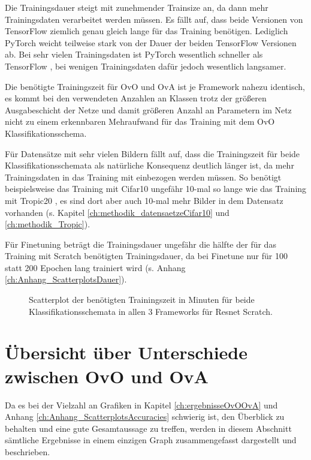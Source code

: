 Die Trainingsdauer steigt mit zunehmender Trainsize an, da dann mehr Trainingsdaten verarbeitet werden müssen.
Es fällt auf, dass beide Versionen von TensorFlow \cite{tensorflow} ziemlich genau gleich lange für das Training benötigen. Lediglich PyTorch \cite{pytorch} weicht teilweise stark von der Dauer der beiden TensorFlow \cite{tensorflow} Versionen ab. Bei sehr vielen Trainingsdaten ist PyTorch \cite{pytorch} wesentlich schneller als TensorFlow \cite{tensorflow}, bei wenigen Trainingsdaten dafür jedoch wesentlich langsamer.

Die benötigte Trainingszeit für OvO und OvA ist je Framework nahezu identisch, es kommt bei den verwendeten Anzahlen an Klassen trotz der größeren Ausgabeschicht der Netze und damit größeren Anzahl an Parametern im Netz nicht zu einem erkennbaren Mehraufwand für das Training mit dem OvO Klassifikationsschema.

Für Datensätze mit sehr vielen Bildern fällt auf, dass die Trainingszeit für beide Klassifikationsschemata als natürliche Konsequenz deutlich länger ist, da mehr Trainingsdaten in das Training mit einbezogen werden müssen. So benötigt beispielsweise das Training mit Cifar10 \cite{cifar10} ungefähr 10-mal so lange wie das Training mit Tropic20 \cite{pawaraWebsiteDatensaetze}, es sind dort aber auch 10-mal mehr Bilder in dem Datensatz vorhanden (s. Kapitel \ref{ch:methodik_datensaetzeCifar10} und \ref{ch:methodik_Tropic}).

Für Finetuning beträgt die Trainingsdauer ungefähr die hälfte der für das Training mit Scratch benötigten Trainingsdauer, da bei Finetune nur für 100 statt 200 Epochen lang trainiert wird (s. Anhang \ref{ch:Anhang_ScatterplotsDauer}).


\begin{figure}[H]
\begin{adjustbox}{width=\textwidth, center}

\end{adjustbox}
\caption{Scatterplot der benötigten Trainingszeit in Minuten für beide Klassifikationsschemata in allen 3 Frameworks für Resnet Scratch.}
\label{fig:ScatterplotRS-dauer}
\end{figure}

\section{Übersicht über Unterschiede zwischen OvO und OvA}
Da es bei der Vielzahl an Grafiken in Kapitel \ref{ch:ergebnisseOvOOvA} und Anhang \ref{ch:Anhang_ScatterplotsAccuracies} schwierig ist, den Überblick zu behalten und eine gute Gesamtaussage zu treffen, werden in diesem Abschnitt sämtliche Ergebnisse in einem einzigen Graph zusammengefasst dargestellt und beschrieben.\\


